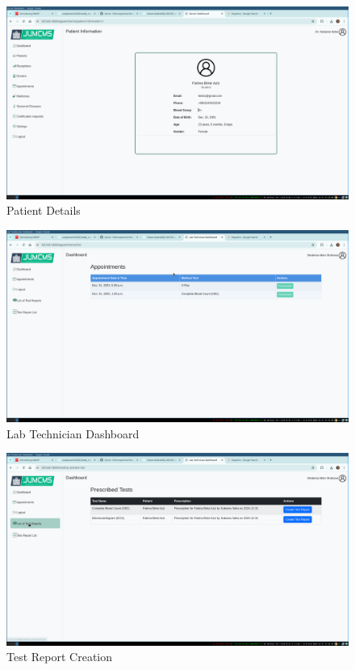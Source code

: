 \documentclass[a4paper,12pt]{article}
\begin{document}
\begin{figure}[H]
    \centering
    \includegraphics[width=1\textwidth]{images/sprintoutput02.png}
    \caption{Patient Details}
    \label{fig:patientdetails}
\end{figure}

\begin{figure}[H]
    \centering
    \includegraphics[width=1\textwidth]{images/sprintoutput03.png}
    \caption{Lab Technician Dashboard}
    \label{fig:labtechniciandashboard}
\end{figure}

\begin{figure}[H]
    \centering
    \includegraphics[width=1\textwidth]{images/sprintoutput05.png}
    \caption{Test Report Creation}
    \label{fig:reportcreation}
\end{figure}
\end{document}
